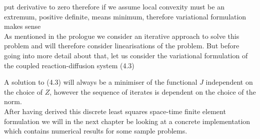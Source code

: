 \documentclass[../draft_1.tex]{subfiles}
\begin{document}
put derivative to zero therefore if we assume local convexity must be an extremum, positive definite, means minimum, therefore variational formulation makes sense 
\bigskip
\\
As mentioned in the prologue we consider an iterative approach to solve this problem and will therefore consider linearisations of the problem. But before going into more detail about that, let us consider the variational formulation of the coupled reaction-diffusion system (4.3)

A solution to (4.3) will always be a minimiser of the functional $J$ independent on the choice of $Z$, however the sequence of iterates is dependent on the choice of the norm. 
\smallskip
\\
After having derived this discrete least squares space-time finite element formulation we will in the next chapter be looking at a concrete implementation which contains numerical results for some sample problems. 
\end{document}
